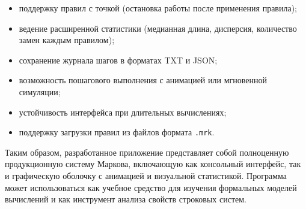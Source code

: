 \begin{itemize}
	\item поддержку правил с точкой (остановка работы после применения правила);
	\item ведение расширенной статистики (медианная длина, дисперсия, количество замен каждым правилом);
	\item сохранение журнала шагов в форматах TXT и JSON;
	\item возможность пошагового выполнения с анимацией или мгновенной симуляции;
	\item устойчивость интерфейса при длительных вычислениях;
	\item поддержку загрузки правил из файлов формата \texttt{.mrk}.
\end{itemize}


Таким образом, разработанное приложение представляет собой полноценную продукционную систему Маркова, включающую как консольный интерфейс, так и графическую оболочку с анимацией и визуальной статистикой. Программа может использоваться как учебное средство для изучения формальных моделей вычислений и как инструмент анализа свойств строковых систем.
